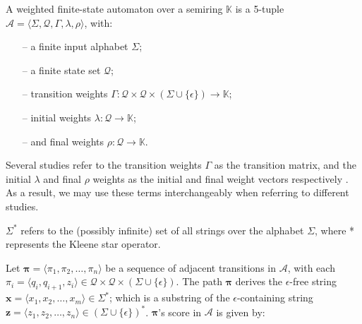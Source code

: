 \begin{definition}
  \label{def:wfsa}
  A weighted finite-state automaton over a semiring $\mathbb{K}$ is a 5-tuple $\mathcal{A} = \langle \Sigma, \mathcal{Q}, \Gamma, \lambda, \rho \rangle$, with:

  \begin{itemize}
    \itemsep0em 
    \item[--] a finite input alphabet $\Sigma$;
    \item[--] a finite state set $\mathcal{Q}$;
    \item[--] transition weights $\Gamma: \mathcal{Q} \times \mathcal{Q} \times (\Sigma \cup \{\epsilon\}) \rightarrow \mathbb{K}$;
    \item[--] initial weights $\lambda: \mathcal{Q} \rightarrow \mathbb{K}$; 
    \item[--] and final weights $\rho: \mathcal{Q} \rightarrow \mathbb{K}$.
  \end{itemize}

  \begin{remark}
    Several studies refer to the transition weights $\Gamma$ as the transition matrix, and the initial $\lambda$ and final $\rho$ weights as the initial and final weight vectors respectively \citep{schwartz2018sopa,jiang2020cold}. As a result, we may use these terms interchangeably when referring to different studies.
  \end{remark}
    
  \begin{remark}
    $\Sigma^{*}$ refers to the (possibly infinite) set of all strings over the alphabet $\Sigma$, where * represents the Kleene star operator.
  \end{remark}
   
\end{definition}

\begin{definition}

  Let $\pmb{\pi} = \langle \pi_1, \pi_2, \dots, \pi_n \rangle$ be a sequence of adjacent transitions in $\mathcal{A}$, with each $\pi_i = \langle q_i, q_{i+1}, z_i \rangle \in \mathcal{Q} \times \mathcal{Q} \times (\Sigma \cup \{\epsilon\})$. The path $\pmb{\pi}$ derives the $\epsilon$-free string $\pmb{x} = \langle x_1, x_2, \dots, x_m \rangle \in \Sigma^{*}$; which is a substring of the $\epsilon$-containing string $\pmb{z} = \langle z_1, z_2, \dots, z_n \rangle \in (\Sigma \cup \{\epsilon\})^{*}$. $\pmb{\pi}$'s score in $\mathcal{A}$ is given by:
  
\end{definition}

